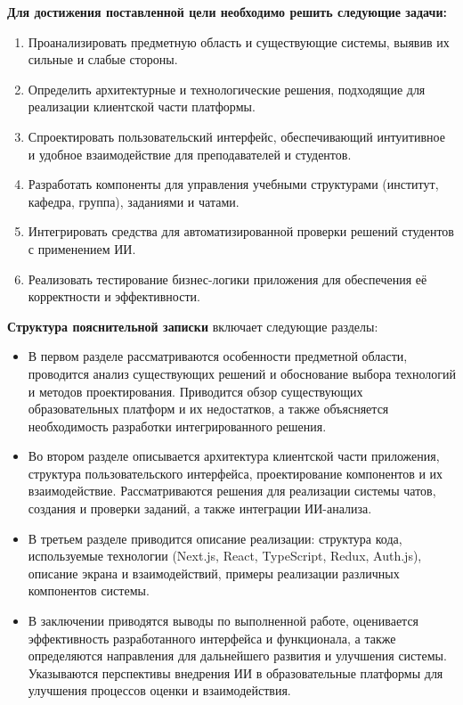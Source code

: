\textbf{Для достижения поставленной цели необходимо решить следующие задачи:}
\begin{enumerate}
\item Проанализировать предметную область и существующие системы, выявив их сильные и слабые стороны.
\item Определить архитектурные и технологические решения, подходящие для реализации клиентской части платформы.
\item Спроектировать пользовательский интерфейс, обеспечивающий интуитивное и удобное взаимодействие для преподавателей и студентов.
\item Разработать компоненты для управления учебными структурами (институт, кафедра, группа), заданиями и чатами.
\item Интегрировать средства для автоматизированной проверки решений студентов с применением ИИ.
\item Реализовать тестирование бизнес-логики приложения для обеспечения её корректности и эффективности.
\end{enumerate}

\textbf{Структура пояснительной записки} включает следующие разделы:
\begin{itemize}
\item В первом разделе рассматриваются особенности предметной области, проводится анализ существующих решений и обоснование выбора технологий и методов проектирования. Приводится обзор существующих образовательных платформ и их недостатков, а также объясняется необходимость разработки интегрированного решения.
\item Во втором разделе описывается архитектура клиентской части приложения, структура пользовательского интерфейса, проектирование компонентов и их взаимодействие. Рассматриваются решения для реализации системы чатов, создания и проверки заданий, а также интеграции ИИ-анализа.
\item В третьем разделе приводится описание реализации: структура кода, используемые технологии (Next.js, React, TypeScript, Redux, Auth.js), описание экрана и взаимодействий, примеры реализации различных компонентов системы.
\item В заключении приводятся выводы по выполненной работе, оценивается эффективность разработанного интерфейса и функционала, а также определяются направления для дальнейшего развития и улучшения системы. Указываются перспективы внедрения ИИ в образовательные платформы для улучшения процессов оценки и взаимодействия.
\end{itemize}
